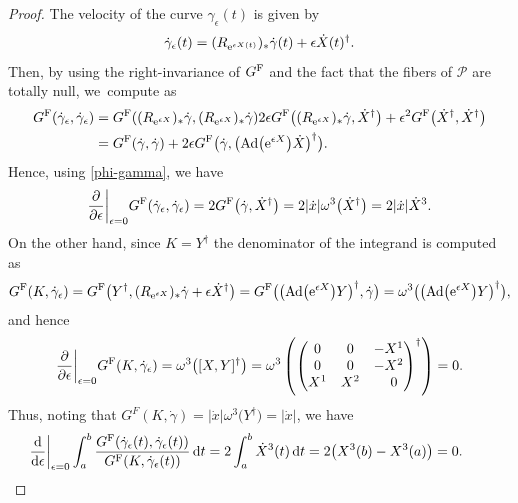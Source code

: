 \documentclass[pdftex]{sigma}
\numberwithin{equation}{section}
\begin{document}
\begin{proof}
The velocity of the curve $\gamma_\epsilon(t)$ is given by
\[
\dot\gamma_\epsilon(t)=(R_{{\rm e}^{\epsilon X(t)}})_* \dot\gamma(t)+\epsilon\dot X(t)^{\dagger}.
\]
Then, by using the right-invariance of $G^{\rm F}$ and the fact that the fibers of $\mathcal{P}$ are totally null, we~compute as
\begin{align*}
G^{\rm F}(\dot\gamma_\epsilon, \dot\gamma_\epsilon)
={}&G^{\rm F} ((R_{{\rm e}^{\epsilon X}})_* \dot\gamma, (R_{{\rm e}^{\epsilon X}})_* \dot\gamma )
 2\epsilon G^{\rm F}\bigl((R_{{\rm e}^{\epsilon X}})_* \dot\gamma,
\dot X^{\dagger}\bigr)+\epsilon^2G^{\rm F}\bigl(\dot X^\dagger, \dot X^\dagger\bigr) \\
={}&G^{\rm F}(\dot\gamma, \dot\gamma)
+2\epsilon G^{\rm F}\bigl(\dot\gamma, \bigl({\rm Ad}\bigl({\rm e}^{\epsilon X}\bigr)\dot X\bigr)^\dagger\bigr).
\end{align*}
Hence, using \eqref{phi-gamma}, we have
\begin{equation*}%
\frac{\partial}{\partial \epsilon}\bigg|_{\epsilon=0}G^{\rm F}(\dot\gamma_\epsilon, \dot\gamma_\epsilon)
=2G^{\rm F}\bigl(\dot\gamma, \dot X^\dagger\bigr)
=2|\dot x|\omega^3\bigl(\dot X^\dagger\bigr)=2|\dot x|\dot X^3.
\end{equation*}
On the other hand, since $K=Y^\dagger$ the denominator of the integrand is computed as
\begin{align*}
G^{\rm F}(K, \dot\gamma_\epsilon)
=G^{\rm F}\bigl(Y^\dagger, (R_{{\rm e}^{\epsilon X}})_* \dot\gamma+\epsilon\dot X^{\dagger}\bigr)
=G^{\rm F}\bigl(\bigl({\rm Ad}\bigl({\rm e}^{\epsilon X}\bigr) Y\bigr)^\dagger, \dot\gamma\bigr)
=\omega^3\bigl(\bigl({\rm Ad}\bigl({\rm e}^{\epsilon X}\bigr) Y\bigr)^\dagger\bigr),
\end{align*}
and hence
\[
\frac{\partial}{\partial \epsilon}\bigg|_{\epsilon=0}G^{\rm F}(K, \dot\gamma_\epsilon)
=\omega^3\bigl([X, Y]^\dagger\bigr) =\omega^3\left(\begin{pmatrix}
0 & 0 & -X^1 \\
0 & 0 & -X^2 \\
X^1 & X^2 & \hphantom{-}0
\end{pmatrix}^{\dagger}\right)=0.
\]
Thus, noting that $G^{F}(K, \dot\gamma)=|\dot x|\omega^3\bigl(Y^\dagger\bigr)=|\dot x|$, we have
\[
\frac{\mathrm{d}}{\mathrm{d} \epsilon}\bigg|_{\epsilon=0}
\int _a^b \frac{G^{\rm F}(\dot \gamma_\epsilon(t), \dot \gamma_\epsilon(t))}{G^{\rm F}(K, \dot \gamma_\epsilon(t))}\,{\rm d}t=
2\int_a^b \dot X^3(t) \, {\rm d}t=2\bigl(X^3(b)-X^3(a)\bigr)=0.
\tag*{\qed}
\]
\renewcommand{\qed}{}
\end{proof}
\end{document}
